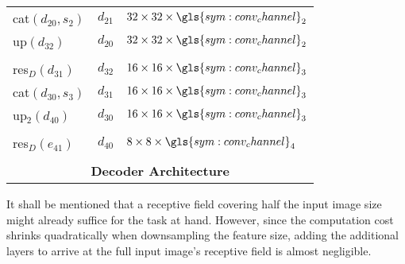 \begin{center}
\begin{minipage}{0.55\textwidth}
\begin{tabular}{l|c|l}
			cat$(d_{20},s_2)$ & $d_{21}$ & $32 \times 32 \times \gls{sym:conv_channel}_2$\\
			up$(d_{32})$ & $d_{20}$ & $32 \times 32 \times \gls{sym:conv_channel}_2$\\
			\hline
			&&\\
			res$_D(d_{31})$ & $d_{32}$ & $16 \times 16 \times \gls{sym:conv_channel}_3$\\
			cat$(d_{30},s_3)$ & $d_{31}$ & $16 \times 16 \times \gls{sym:conv_channel}_3$\\
			up$_2(d_{40})$ & $d_{30}$ & $16 \times 16 \times \gls{sym:conv_channel}_3$\\
			\hline
			&&\\
			res$_D(e_{41})$ & $d_{40}$ & $8 \times 8 \times \gls{sym:conv_channel}_4$\\
			\multicolumn{3}{c}{}             \\
			\multicolumn{3}{c}{\textbf{Decoder Architecture}} \\
		\end{tabular}
	\end{minipage}
\end{center}
It shall be mentioned that a receptive field covering half the input image size might already suffice for the task at hand. However, since the computation cost shrinks quadratically when downsampling the feature size, adding the additional layers to arrive at the full input image's receptive field is almost negligible. 
%
